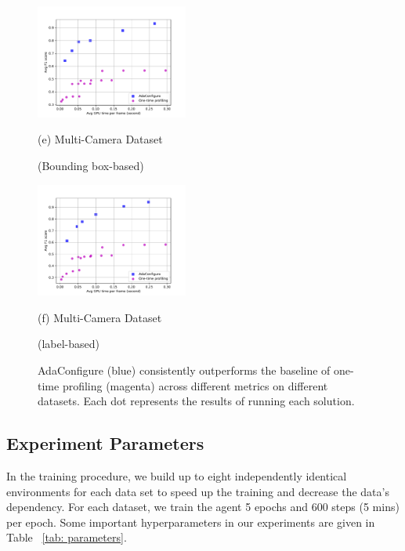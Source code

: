 \begin{figure}[!t]
\begin{minipage}[t]{0.47\linewidth}
	\end{minipage}
	\vfill
	\begin{minipage}[t]{0.47\linewidth}
	\centerline{\includegraphics[width=5cm]{figures/_Westbound_Eastbound_Rear.pdf}}
	\centerline{(e) Multi-Camera Dataset }%
	\centerline{(Bounding box-based)}
	\end{minipage}
	\hfill
	\begin{minipage}[t]{0.47\linewidth}
	\centerline{\includegraphics[width=5cm]{figures/_Westbound_Eastbound_Rear_label.pdf}}
	\centerline{(f) Multi-Camera Dataset }%
	\centerline{(label-based)}
	\end{minipage}		
	\caption{AdaConfigure (blue) consistently outperforms the baseline of one-time profiling (magenta) across different metrics on different datasets. Each dot represents the results of running each solution.}
	\label{fig: results}
\end{figure}


\subsection{Experiment Parameters}
In the training procedure, we build up to eight independently identical environments for each data set to speed up the training and decrease the data's dependency. For each dataset, we train the agent 5 epochs and 600 steps (5 mins) per epoch. Some important hyperparameters in our experiments are given in Table ~\ref{tab: parameters}.

